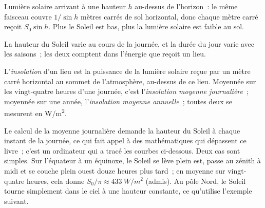 \begin{omfigure}

{\small Lumière solaire arrivant à une hauteur $h$ au-dessus de l'horizon~:
le même faisceau couvre $1/\sin h$ mètres carrés de sol horizontal, donc
chaque mètre carré reçoit $S_0 \sin h$. Plus le Soleil est bas, plus la
lumière solaire est faible au sol.}
\end{omfigure}

La hauteur du Soleil varie au cours de la journée, et la durée du jour
varie avec les saisons~; les deux comptent dans l'énergie que reçoit un
lieu.

\begin{definition}[Insolation]\label{def:g10:earth-energy-budget:insolation}
L'\emph{insolation} d'un lieu est la puissance de la
lumière solaire reçue par un mètre carré horizontal au sommet de
l'atmosphère, au-dessus de ce lieu. Moyennée sur les vingt-quatre heures
d'une journée, c'est l'\emph{insolation moyenne journalière}~; moyennée sur
une année, l'\emph{insolation moyenne annuelle}~; toutes deux se mesurent en
\unit{W/m^2}.
\end{definition}

Le calcul de la moyenne journalière demande la hauteur du Soleil à chaque
instant de la journée, ce qui fait appel à des mathématiques qui dépassent
ce livre~; c'est un ordinateur qui a tracé les courbes ci-dessous. Deux cas
sont simples. Sur l'équateur à un équinoxe, le Soleil se lève plein est,
passe au zénith à midi et se couche plein ouest douze heures plus tard~; en
moyenne sur vingt-quatre heures, cela donne
$S_0/\pi \approx \qty{433}{W/m^2}$ (admis). Au pôle Nord, le Soleil tourne
simplement dans le ciel à une hauteur constante, ce qu'utilise l'exemple
suivant.

